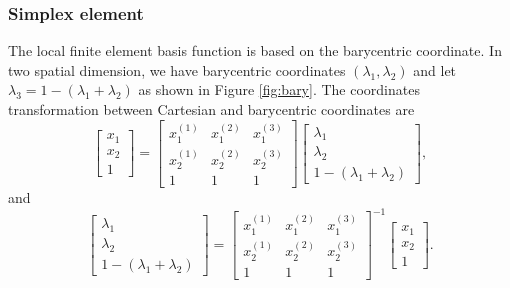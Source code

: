 \documentclass[a4paper,11pt]{scrartcl}
\newcommand{\eq}[1]{\begin{equation} #1 \end{equation}}
\begin{document}
\subsubsection{Simplex element}
\def\arraystretch{1.5}
%
\newcommand{\centerrow}[1]{\smash{\raisebox{.6\normalbaselineskip}{#1}}}
%
\newcommand{\vertices}{\left[ \begin{array}{l|l|l} x^{(1)}_1 & x^{(2)}_1 & x^{(3)}_1 \\ x^{(1)}_2 & x^{(2)}_2 & x^{(3)}_2 \\ 1 & 1 & 1 \end{array} \right]}
%
\newcommand{\bcoord}{\left[ \begin{array}{l} \lambda_1 \\ \lambda_2 \\ 1 - (\lambda_1 + \lambda_2) \end{array} \right]}
%
\newcommand{\ax}{\left[ \begin{array}{l} x_1 \\ x_2 \\ 1 \end{array} \right]}
%

The local finite element basis function is based on the barycentric coordinate. In two spatial dimension, we have barycentric coordinates $(\lambda_1, \lambda_2)$ and let $\lambda_3 = 1 - (\lambda_1 + \lambda_2)$ as shown in Figure \ref{fig:bary}.
%
The coordinates transformation between Cartesian and barycentric coordinates are
\eq{
\ax = \vertices \bcoord,
}
and
\eq{
\bcoord = \vertices^{-1} \ax.
}
\end{document}
